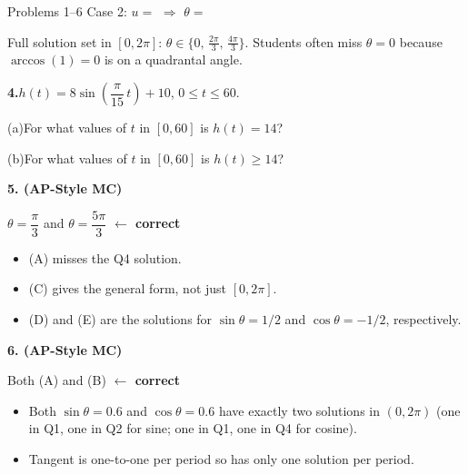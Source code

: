 \documentclass[10pt]{article}
\begin{document}
\begin{notesbox}{Problems 1--6}
\vspace{4pt}
Case 2: $u = $  $\Rightarrow$ $\theta = $ 

\begin{teachernote}
Full solution set in $[0,2\pi]$: $\theta \in \{0,\,\tfrac{2\pi}{3},\,\tfrac{4\pi}{3}\}$.
Students often miss $\theta=0$ because $\arccos(1)=0$ is on a quadrantal angle.
\end{teachernote}

\vspace{0.14in}
\textbf{4.}\quad $h(t) = 8\sin\!\left(\dfrac{\pi}{15}\,t\right) + 10$, $0 \le t \le 60$.

\vspace{4pt}
(a)\quad For what values of $t$ in $[0, 60]$ is $h(t) = 14$?


\vspace{4pt}
(b)\quad For what values of $t$ in $[0, 60]$ is $h(t) \ge 14$?

\ans{$[2.5,\,12.5]\cup[32.5,\,42.5]$}

\vspace{0.14in}
\textbf{5. (AP-Style MC)}

 \quad $\theta = \dfrac{\pi}{3}$ and $\theta = \dfrac{5\pi}{3}$
\textcolor{keyred}{\textbf{$\leftarrow$ correct}}

\begin{itemize}[leftmargin=1.4em, itemsep=2pt]
  \item (A) misses the Q4 solution.
  \item (C) gives the general form, not just $[0,2\pi]$.
  \item (D) and (E) are the solutions for $\sin\theta=1/2$ and $\cos\theta=-1/2$, respectively.
\end{itemize}

\vspace{0.14in}
\textbf{6. (AP-Style MC)}

 \quad Both (A) and (B) \textcolor{keyred}{\textbf{$\leftarrow$ correct}}

\begin{itemize}[leftmargin=1.4em, itemsep=2pt]
  \item Both $\sin\theta=0.6$ and $\cos\theta=0.6$ have exactly two solutions in $(0,2\pi)$ (one in Q1, one in Q2 for sine; one in Q1, one in Q4 for cosine).
  \item Tangent is one-to-one per period so has only one solution per period.
\end{itemize}

\end{notesbox}
\end{document}
